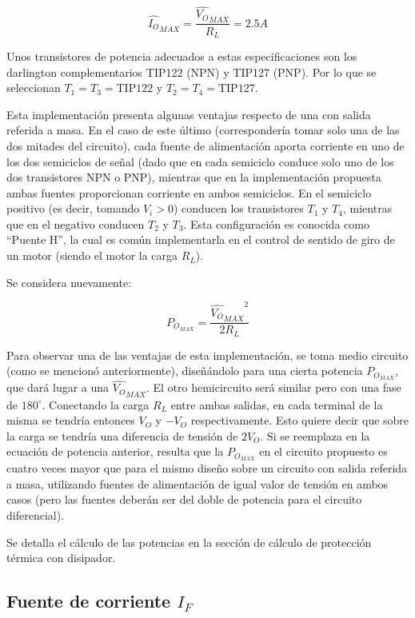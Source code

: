 \[
\hat{I_O}_{MAX} = \frac{\hat{V_O}_{MAX}}{R_L} = 2.5A
\]

Unos transistores de potencia adecuados a estas especificaciones son los darlington complementarios TIP122 (NPN) y TIP127 (PNP). Por lo que se seleccionan $T_1 = T_3 = \textrm{TIP122}$ y $T_2 = T_4 = \textrm{TIP127}$. 


Esta implementación presenta algunas ventajas respecto de una con salida referida a masa. En el caso de este último (correspondería tomar solo una de las dos mitades del circuito), cada fuente de alimentación aporta corriente en uno de los dos semiciclos de señal (dado que en cada semiciclo conduce solo uno de los dos transistores NPN o PNP), mientras que en la implementación propuesta ambas fuentes proporcionan corriente en ambos semiciclos. En el semiciclo positivo (es decir, tomando $V_i > 0$) conducen los transistores $T_1$ y $T_4$, mientras que en el negativo conducen $T_2$ y $T_3$. Esta configuración es conocida como ``Puente H'', la cual es común implementarla en el control de sentido de giro de un motor (siendo el motor la carga $R_L$).\par
Se considera nuevamente:

\[
P_{O_{MAX}} = \frac{{\hat{V_O}_{MAX}}^2}{2R_L}
\]

Para observar una de las ventajas de esta implementación, se toma medio circuito (como se mencionó anteriormente), diseñándolo para una cierta potencia $P_{O_{MAX}}$, que dará lugar a una $\hat{V_O}_{MAX}$. El otro hemicircuito será similar pero con una fase de $180^{\circ}$. Conectando la carga $R_L$ entre ambas salidas, en cada terminal de la misma se tendría entonces $V_O$ y $-V_O$ respectivamente. Esto quiere decir que sobre la carga se tendría una diferencia de tensión de $2V_O$. Si se reemplaza en la ecuación de potencia anterior, resulta que la $P_{O_{MAX}}$ en el circuito propuesto es cuatro veces mayor que para el mismo diseño sobre un circuito con salida referida a masa, utilizando fuentes de alimentación de igual valor de tensión en ambos casos (pero las fuentes deberán ser del doble de potencia para el circuito diferencial).\par
Se detalla el cálculo de las potencias en la sección de cálculo de protección térmica con disipador.

\subsection{Fuente de corriente $I_F$}


